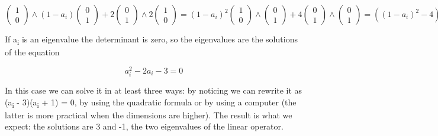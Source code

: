 \documentclass[oneside,english]{amsbook}
\numberwithin{section}{chapter}
\theoremstyle{plain}
\theoremstyle{definition}
\begin{document}
\[{\begin{pmatrix}
		1 \\
		0
	\end{pmatrix} \land \left( 1 - a_{i} \right)\begin{pmatrix}
		0 \\
		1
	\end{pmatrix} + 2\begin{pmatrix}
		0 \\
		1
	\end{pmatrix} \land 2\begin{pmatrix}
		1 \\
		0
	\end{pmatrix}
}{= \left( 1 - a_{i} \right)^{2}\begin{pmatrix}
		1 \\
		0
	\end{pmatrix} \land \begin{pmatrix}
		0 \\
		1
	\end{pmatrix} + 4\begin{pmatrix}
		0 \\
		1
	\end{pmatrix} \land \begin{pmatrix}
		0 \\
		1
	\end{pmatrix}
}{= \left( \left( 1 - a_{i} \right)^{2} - 4 \right)\begin{pmatrix}
		1 \\
		0
	\end{pmatrix} \land \begin{pmatrix}
		0 \\
		1
	\end{pmatrix}
}{= \left( a_{i}^{2} - 2a_{i} - 3 \right)\begin{pmatrix}
		1 \\
		0
	\end{pmatrix} \land \begin{pmatrix}
		0 \\
		1
\end{pmatrix}}\]

If a\textsubscript{i} is an eigenvalue the determinant is zero, so the
eigenvalues are the solutions of the equation

\[a_{i}^{2} - 2a_{i} - 3 = 0\]

In this case we can solve it in at least three ways: by noticing we can
rewrite it as (a\textsubscript{i} - 3)(a\textsubscript{i} + 1) = 0, by
using the quadratic formula or by using a computer (the latter is more
practical when the dimensions are higher). The result is what we expect:
the solutions are 3 and -1, the two eigenvalues of the linear operator.
\end{document}
